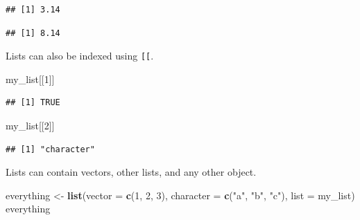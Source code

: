 \documentclass[openany]{book}
\newenvironment{Shaded}{\begin{snugshade}}{\end{snugshade}}
\newcommand{\DataTypeTok}[1]{\textcolor[rgb]{0.13,0.29,0.53}{#1}}
\newcommand{\DecValTok}[1]{\textcolor[rgb]{0.00,0.00,0.81}{#1}}
\newcommand{\KeywordTok}[1]{\textcolor[rgb]{0.13,0.29,0.53}{\textbf{#1}}}
\newcommand{\NormalTok}[1]{#1}
\newcommand{\OperatorTok}[1]{\textcolor[rgb]{0.81,0.36,0.00}{\textbf{#1}}}
\newcommand{\StringTok}[1]{\textcolor[rgb]{0.31,0.60,0.02}{#1}}
\begin{document}
\begin{Shaded}
\end{Shaded}

\begin{verbatim}
## [1] 3.14
\end{verbatim}

\begin{Shaded}
\end{Shaded}

\begin{verbatim}
## [1] 8.14
\end{verbatim}

Lists can also be indexed using \texttt{{[}{[}}.

\begin{Shaded}
\begin{Highlighting}[]
\NormalTok{my_list[[}\DecValTok{1}\NormalTok{]]}
\end{Highlighting}
\end{Shaded}

\begin{verbatim}
## [1] TRUE
\end{verbatim}

\begin{Shaded}
\begin{Highlighting}[]
\NormalTok{my_list[[}\DecValTok{2}\NormalTok{]]}
\end{Highlighting}
\end{Shaded}

\begin{verbatim}
## [1] "character"
\end{verbatim}

Lists can contain vectors, other lists, and any other object.

\begin{Shaded}
\begin{Highlighting}[]
\NormalTok{everything <-}\StringTok{ }\KeywordTok{list}\NormalTok{(}\DataTypeTok{vector =} \KeywordTok{c}\NormalTok{(}\DecValTok{1}\NormalTok{, }\DecValTok{2}\NormalTok{, }\DecValTok{3}\NormalTok{), }
                   \DataTypeTok{character =} \KeywordTok{c}\NormalTok{(}\StringTok{"a"}\NormalTok{, }\StringTok{"b"}\NormalTok{, }\StringTok{"c"}\NormalTok{), }
                   \DataTypeTok{list =}\NormalTok{ my_list)}
\NormalTok{everything}
\end{Highlighting}
\end{Shaded}
\end{document}
